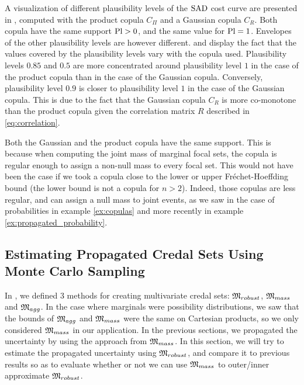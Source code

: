 A visualization of different plausibility levels of the $\mathrm{SAD}$ cost curve are presented in , computed with the product copula $C_\Pi$ and a Gaussian copula $C_R$. Both copula have the same support $\mathrm{Pl}>0$, and the same value for $\mathrm{Pl}=1$. Envelopes of the other plausibility levels are however different.  and  display the fact that the values covered by the plausibility levels vary with the copula used. Plausibility levels $0.85$ and $0.5$ are more concentrated around plausibility level $1$ in the case of the product copula than in the case of the Gaussian copula. Conversely, plausibility level $0.9$ is closer to plausibility level $1$ in the case of the Gaussian copula. This is due to the fact that the Gaussian copula $C_R$ is more co-monotone than the product copula given the correlation matrix $R$ described in \eqref{eq:correlation}.
\begin{remark}
    Both the Gaussian and the product copula have the same support. This is because when computing the joint mass of marginal focal sets, the copula is regular enough to assign a non-null mass to every focal set. This would not have been the case if we took a copula close to the lower or upper Fréchet-Hoeffding bound (the lower bound is not a copula for $n>2$). Indeed, those copulas are less regular, and can assign a null mass to joint events, as we saw in the case of probabilities in example \ref{ex:copulas} and more recently in example \ref{ex:propagated_probability}.
\end{remark}

\subsection{Estimating Propagated Credal Sets Using Monte Carlo Sampling}\label{sec:montecarlo}
In , we defined $3$ methods for creating multivariate credal sets: $\mathfrak{M}_{robust}$, $\mathfrak{M}_{mass}$ and $\mathfrak{M}_{agg}$. In the case where marginals were possibility distributions, we saw that the bounds of $\mathfrak{M}_{agg}$ and $\mathfrak{M}_{mass}$ were the same on Cartesian products, so we only considered $\mathfrak{M}_{mass}$ in our application. In the previous sections, we propagated the uncertainty by using the approach from $\mathfrak{M}_{mass}$. In this section, we will try to estimate the propagated uncertainty using $\mathfrak{M}_{robust}$, and compare it to previous results so as to evaluate whether or not we can use $\mathfrak{M}_{mass}$ to outer/inner approximate $\mathfrak{M}_{robust}$.

